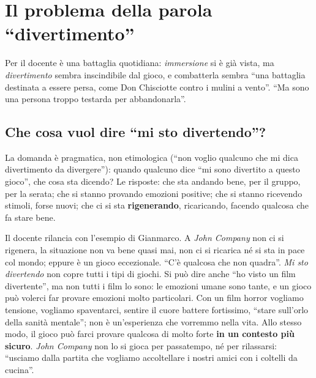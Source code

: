 \section{Il problema della parola ``divertimento''}
\label{a5:sec:divertimento}



Per il docente è una battaglia quotidiana: \emph{immersione} si è già vista, ma
\emph{divertimento} sembra inscindibile dal gioco, e combatterla sembra ``una
battaglia destinata a essere persa, come Don Chisciotte contro i mulini a vento''.
``Ma sono una persona troppo testarda per abbandonarla''.

\subsection{Che cosa vuol dire ``mi sto divertendo''?}



La domanda è pragmatica, non etimologica (``non voglio qualcuno che mi dica
divertimento da divergere''): quando qualcuno dice ``mi sono divertito a questo
gioco'', che cosa sta dicendo? Le risposte: che sta andando bene, per il gruppo, per
la serata; che si stanno provando emozioni positive; che si stanno ricevendo stimoli,
forse nuovi; che ci si sta \textbf{rigenerando}, ricaricando, facendo qualcosa che fa
stare bene.

Il docente rilancia con l'esempio di Gianmarco. A \emph{John Company} non ci si
rigenera, la situazione non va bene quasi mai, non ci si ricarica né si sta in pace
col mondo; eppure è un gioco eccezionale. ``C'è qualcosa che non quadra''.
\emph{Mi sto divertendo} non copre tutti i tipi di giochi. Si può dire anche ``ho
visto un film divertente'', ma non tutti i film lo sono: le emozioni umane sono
tante, e un gioco può volerci far provare emozioni molto particolari. Con un film
horror vogliamo tensione, vogliamo spaventarci, sentire il cuore battere
fortissimo, ``stare sull'orlo della sanità mentale''; non è un'esperienza che
vorremmo nella vita. Allo stesso modo, il gioco può farci provare qualcosa di molto
forte \textbf{in un contesto più sicuro}. \emph{John Company} non lo si gioca per
passatempo, né per rilassarsi: ``usciamo dalla partita che vogliamo accoltellare i
nostri amici con i coltelli da cucina''.

